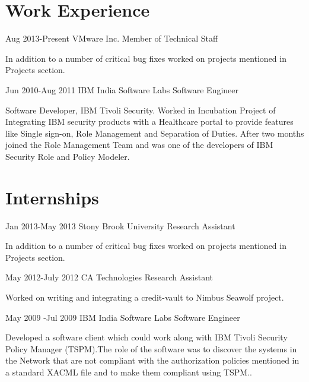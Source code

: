 \documentclass[10pt]{article} %
\begin{document}
\section{Work Experience}
\job 
{Aug 2013-}{Present}
{VMware Inc.}
{Member of Technical Staff}
{
\begin{itemize-noindent}
\item{In addition to a number of critical bug fixes worked on projects mentioned in Projects section.}
\end{itemize-noindent}
}

\job 
{Jun 2010-}{Aug 2011}
{IBM India Software Labs}
{Software Engineer}
{
\begin{itemize-noindent}
\item{Software Developer, IBM Tivoli Security. Worked in Incubation Project of Integrating IBM security products with a Healthcare portal to provide features like Single sign-on, Role Management and Separation of Duties. After two months joined the Role Management Team and was one of the developers of IBM Security Role and Policy Modeler.}
\end{itemize-noindent}
}

\section{Internships}
\job 
{Jan 2013-}{May 2013}
{Stony Brook University}
{Research Assistant}
{
\begin{itemize-noindent}
\item{In addition to a number of critical bug fixes worked on projects mentioned in Projects section.}
\end{itemize-noindent}
}
\job 
{May 2012-}{July 2012}
{CA Technologies}
{Research Assistant}
{
\begin{itemize-noindent}
\item{Worked on writing and integrating a credit-vault to Nimbus Seawolf project.}
\end{itemize-noindent}
}
\job 
{May 2009 -}{Jul 2009}
{IBM India Software Labs}
{Software Engineer}
{
\begin{itemize-noindent}
\item{Developed a software client which could work along with IBM Tivoli Security Policy Manager (TSPM).The role of the software was to discover the systems in the Network that are not compliant with the authorization policies mentioned in a standard XACML file and to make them compliant using TSPM..}
\end{itemize-noindent}
}
\end{document}

